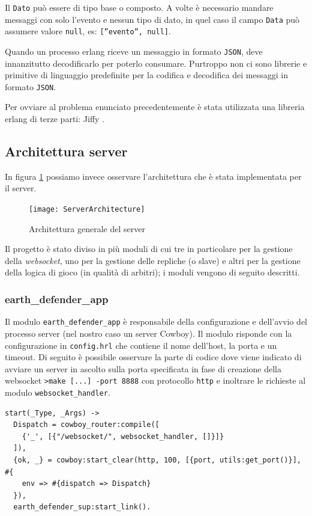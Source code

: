 \documentclass[paper=a4, fontsize=11pt]{scrartcl} %
\numberwithin{equation}{section} %
\numberwithin{figure}{section} %
\numberwithin{table}{section} %
\begin{document}
Il \texttt{Dato} può essere di tipo base o composto.
A volte è necessario mandare messaggi con solo l'evento e nessun tipo di dato, in quel caso il campo \texttt{Data} può assumere valore \texttt{null}, es: \texttt{[''evento'', null]}.

Quando un processo erlang riceve un messaggio in formato \texttt{JSON}, deve innanzitutto decodificarlo per poterlo consumare. Purtroppo non ci sono librerie e primitive di linguaggio predefinite per la codifica e decodifica dei messaggi in formato \texttt{JSON}.

Per ovviare al problema enunciato precedentemente è stata utilizzata una libreria erlang di terze parti: Jiffy \cite{jiffy}.


\subsection{Architettura server}
In figura \ref{ServerArc} possiamo invece osservare l'architettura che è stata implementata per il server.

\begin{figure}
\centering
\texttt{[image: ServerArchitecture]}
\caption{Architettura generale del server}
\label{ServerArc}
\end{figure}

Il progetto è stato diviso in più moduli di cui tre in particolare per la gestione della \textit{websocket}, uno per la gestione delle repliche (o slave) e altri per la gestione della logica di gioco (in qualità di arbitri); i moduli vengono di seguito descritti.

\subsubsection{earth\_defender\_app}
Il modulo \texttt{earth\_defender\_app} è responsabile della configurazione e dell'avvio del processo server (nel nostro caso un server Cowboy). Il modulo risponde con la configurazione in \texttt{config.hrl} che contiene il nome dell'host, la porta e un timeout.
Di seguito è possibile osservare la parte di codice dove viene indicato di avviare un server in ascolto sulla porta specificata in fase di creazione della websocket \texttt{>make [...] -port 8888} con protocollo \texttt{http} e inoltrare le richieste al modulo \texttt{websocket\_handler}.
\begin{lstlisting}[basicstyle=\footnotesize]
start(_Type, _Args) ->
  Dispatch = cowboy_router:compile([
    {'_', [{"/websocket/", websocket_handler, []}]}
  ]),
  {ok, _} = cowboy:start_clear(http, 100, [{port, utils:get_port()}], #{
    env => #{dispatch => Dispatch}
  }),
  earth_defender_sup:start_link().
\end{lstlisting}
\end{document}
